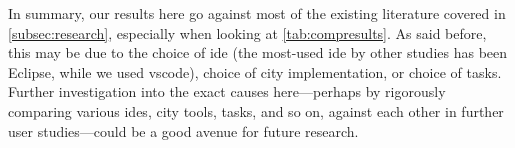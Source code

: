 \documentclass[../thesis]{subfiles}
\begin{document}
In summary, our results here go against most of the existing literature covered in \cref{subsec:research}, especially when looking at \cref{tab:compresults}.
As said before, this may be due to the choice of \gls{ide} (the most-used \gls{ide} by other studies has been Eclipse, while we used \gls{vscode}), choice of \gls{city} implementation, or choice of tasks.
Further investigation into the exact causes here---perhaps by rigorously comparing various \glspl{ide}, \gls{city} tools, tasks, and so on, against each other in further user studies---could be a good avenue for future research.

\end{document}
